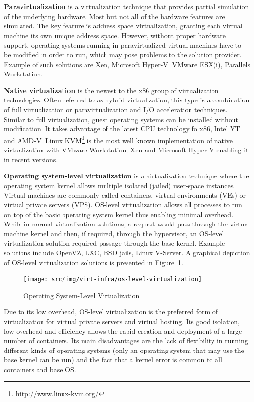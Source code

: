 \textbf{Paravirtualization} is a virtualization technique that provides
partial simulation of the underlying hardware. Most but not all of the
hardware features are simulated. The key feature is address space
virtualization, granting each virtual machine its own unique address space.
However, without proper hardware support, operating systems running in
paravirtualized virtual machines have to be modified in order to run, which
may pose problems to the solution provider. Example of such solutions are Xen,
Microsoft Hyper-V, VMware ESX(i), Parallels Workstation.

\textbf{Native virtualization} is the newest to the x86 group of
virtualization technologies. Often referred to as hybrid virtualization, this
type is a combination of full virtualization or paravirtualization and
I/O acceleration techniques. Similar to full virtualization, guest
operating systems can be installed without modification. It takes advantage of
the latest CPU technology fo x86, Intel VT and AMD-V. Linux
KVM\footnote{\url{http://www.linux-kvm.org/}} is the most
well known implementation of native virtualization with VMware Workstation,
Xen and Microsoft Hyper-V enabling it in recent versions.

\textbf{Operating system-level virtualization} is a virtualization technique
where the operating system kernel allows multiple isolated (jailed) user-space
instances. Virtual machines are commonly called containers, virtual
environments (VEs) or virtual private servers (VPS). OS-level virtualization
allows all processes to run on top of the basic operating system kernel thus
enabling minimal overhead. While in normal virtualization solutions, a request
would pass through the virtual machine kernel and then, if required, through
the hypervisor, an OS-level virtualization solution required passage through
the base kernel. Example solutions include OpenVZ, LXC, BSD jails, Linux
V-Server. A graphical depiction of OS-level virtualization solutions is
presented in Figure~\ref{fig:virt-infra:os-level-virtualization}.

\begin{figure}
  \centering
  \texttt{[image: src/img/virt-infra/os-level-virtualization]}
  \caption{Operating System-Level Virtualization}
  \label{fig:virt-infra:os-level-virtualization}
\end{figure}

Due to its low overhead, OS-level virtualization is the preferred form of
virtualization for virtual private servers and virtual hosting. Its good
isolation, low overhead and efficiency allows the rapid creation and
deployment of a large number of containers. Its main disadvantages are the
lack of flexibility in running different kinds of operating systems (only an
operating system that may use the base kernel can be run) and the fact that a
kernel error is common to all containers and base OS.

